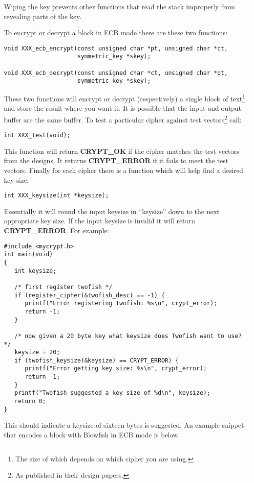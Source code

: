 \documentclass{book}
\begin{document}
Wiping the key prevents other functions that read the stack improperly from revealing parts of the key.

To encrypt or decrypt a block in ECB mode there are these two functions:
 
\begin{verbatim}
void XXX_ecb_encrypt(const unsigned char *pt, unsigned char *ct,
                     symmetric_key *skey);

void XXX_ecb_decrypt(const unsigned char *ct, unsigned char *pt,
                     symmetric_key *skey);
\end{verbatim}
These two functions will encrypt or decrypt (respectively) a single block of text\footnote{The size of which depends on
which cipher you are using.} and store the result where you want it.  It is possible that the input and output buffer are the same buffer.  To test
a particular cipher against test vectors\footnote{As published in their design papers.} call: 
\begin{verbatim}
int XXX_test(void);
\end{verbatim}
This function will return {\bf CRYPT\_OK} if the cipher matches the test vectors from the designs.  It returns
{\bf CRYPT\_ERROR} if it fails to meet the test vectors.  Finally for each cipher there is a function which will help
find a desired key size:
\begin{verbatim}
int XXX_keysize(int *keysize);
\end{verbatim}
Essentially it will round the input keysize in ``keysize'' down to the next appropriate key size.  If the input keysize
is invalid it will return {\bf CRYPT\_ERROR}.  For example:
\begin{small}
\begin{verbatim}
#include <mycrypt.h>
int main(void)
{
   int keysize;

   /* first register twofish */
   if (register_cipher(&twofish_desc) == -1) {
      printf("Error registering Twofish: %s\n", crypt_error);
      return -1;
   }

   /* now given a 20 byte key what keysize does Twofish want to use? */
   keysize = 20;
   if (twofish_keysize(&keysize) == CRYPT_ERROR) {
      printf("Error getting key size: %s\n", crypt_error);
      return -1;
   }
   printf("Twofish suggested a key size of %d\n", keysize);
   return 0;
}
\end{verbatim}
\end{small}
This should indicate a keysize of sixteen bytes is suggested.  An example snippet that encodes a block with 
Blowfish in ECB mode is below.
\end{document}
